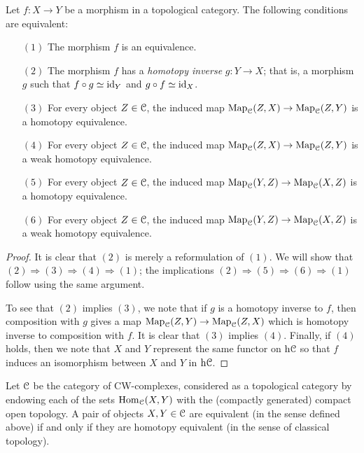 \begin{1.2.4 Objects, morphisms, equivalences}
\begin{proposition}\label{rooot}
Let $f: X \rightarrow Y$ be a morphism in a topological category.
The following conditions are equivalent:

\begin{itemize}
\item[$(1)$] The morphism $f$ is an equivalence.

\item[$(2)$] The morphism $f$ has a {\it homotopy inverse} $g: Y
\rightarrow X$; that is, a morphism $g$ such that $f \circ g
\simeq \operatorname{id}_Y$ and $g \circ f \simeq \operatorname{id}_X$.

\item[$(3)$] For every object $Z \in \operatorname{\mathcal{C}}$, the induced map
$\operatorname{{Map}}_{\operatorname{\mathcal{C}}}(Z,X) \rightarrow \operatorname{{Map}}_{\operatorname{\mathcal{C}}}(Z,Y)$ is a homotopy
equivalence.

\item[$(4)$] For every object $Z \in \operatorname{\mathcal{C}}$, the induced map
$\operatorname{{Map}}_{\operatorname{\mathcal{C}}}(Z,X) \rightarrow \operatorname{{Map}}_{\operatorname{\mathcal{C}}}(Z,Y)$ is a weak
homotopy equivalence.

\item[$(5)$] For every object $Z \in \operatorname{\mathcal{C}}$, the induced map
$\operatorname{{Map}}_{\operatorname{\mathcal{C}}}(Y,Z) \rightarrow \operatorname{{Map}}_{\operatorname{\mathcal{C}}}(X,Z)$ is a homotopy
equivalence.

\item[$(6)$] For every object $Z \in \operatorname{\mathcal{C}}$, the induced map
$\operatorname{{Map}}_{\operatorname{\mathcal{C}}}(Y,Z) \rightarrow \operatorname{{Map}}_{\operatorname{\mathcal{C}}}(X,Z)$ is a weak
homotopy equivalence.
\end{itemize}
\end{proposition}

\begin{proof}
It is clear that $(2)$ is merely a reformulation of $(1)$. We will
show that $(2) \Rightarrow (3) \Rightarrow (4) \Rightarrow (1)$;
the implications $(2) \Rightarrow (5) \Rightarrow (6) \Rightarrow
(1)$ follow using the same argument.

To see that $(2)$ implies $(3)$, we note that if $g$ is a homotopy
inverse to $f$, then composition with $g$ gives a map
$\operatorname{{Map}}_{\operatorname{\mathcal{C}}}(Z,Y) \rightarrow \operatorname{{Map}}_{\operatorname{\mathcal{C}}}(Z,X)$ which is
homotopy inverse to composition with $f$. It is clear that $(3)$
implies $(4)$. Finally, if $(4)$ holds, then we note that $X$ and
$Y$ represent the same functor on $\rm{h} \it{\operatorname{\mathcal{C}}}$ so that $f$ induces an
isomorphism between $X$ and $Y$ in $\rm{h} \it{\operatorname{\mathcal{C}}}$.
\end{proof}

\begin{example}
Let $\operatorname{\mathcal{C}}$ be the category of CW-complexes, considered as a topological category by endowing
each of the sets $\operatorname{Hom}_{\operatorname{\mathcal{C}}}(X,Y)$ with the (compactly generated) compact open topology. A pair of objects $X,Y \in \operatorname{\mathcal{C}}$ are equivalent (in the sense defined above) if and only if they are homotopy equivalent (in the sense of classical topology).
\end{example}


\end{1.2.4 Objects, morphisms, equivalences}
